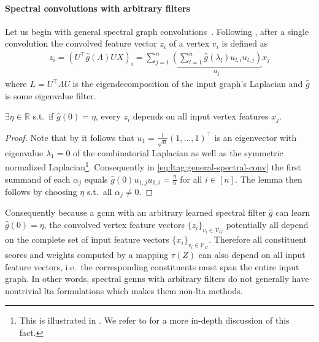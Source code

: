\paragraph{Spectral convolutions with arbitrary filters}
Let us begin with general spectral graph convolutions~\cite{Bruna2013}\cite{Henaff2015}.
Following , after a single convolution the convolved feature vector $z_i$ of a vertex $v_i$ is defined as
\begin{align}\label{eq:ltag:general-spectral-conv}
	z_i = {\left( U^{\top} \hat{g}(\Lambda) U X \right)}_i
	= \sum_{j=1}^n \underbrace{\left( \sum_{l=1}^n \hat{g}(\lambda_l) u_{l,i} u_{l,j} \right)}_{\alpha_j} x_j
\end{align}
where $L = U^{\top} \Lambda U$ is the eigendecomposition of the input graph's Laplacian and $\hat{g}$ is some eigenvalue filter.
\begin{lem}\label{lem:ltag:general-spectral-conv-nonlocality}
	$\exists \eta \in \mathbb{R}$ s.t.\ if $\hat{g}(0) = \eta$, every $z_i$ depends on all input vertex features $x_j$.
\end{lem}
\begin{proof}
	Note that by  it follows that $u_1 = \frac{1}{\sqrt{n}}{(1, \dots, 1)}^{\top}$ is an eigenvector with eigenvalue $\lambda_1 = 0$ of the combinatorial Laplacian as well as the symmetric normalized Laplacian\footnote{
		This is illustrated in . We refer to \citet[section II.C.]{Shuman2013} for a more in-depth discussion of this fact.
	}.
	Consequently in \cref{eq:ltag:general-spectral-conv} the first summand of each $\alpha_j$ equals $\hat{g}(0) u_{1,j} u_{1,i} = \frac{\eta}{n}$ for all $i \in [n]$.
	The lemma then follows by choosing $\eta$ s.t.\ all $\alpha_j \neq 0$.
\end{proof}
Consequently because a \ac{gcnn} with an arbitrary learned spectral filter $\hat{g}$ can learn $\hat{g}(0) = \eta$, the convolved vertex feature vectors ${\{ z_i \}}_{v_i \in \mathcal{V}_G}$ potentially all depend on the complete set of input feature vectors ${\{ x_i \}}_{v_i \in \mathcal{V}_G}$.
Therefore all constituent scores and weights computed by a mapping $\tau(Z)$ can also depend on all input feature vectors, i.e.\ the corresponding constituents must span the entire input graph.
In other words, spectral \acp{gcnn} with arbitrary filters do not generally have nontrivial \ac{lta} formulations which makes them non-\acs{lta} methods.

